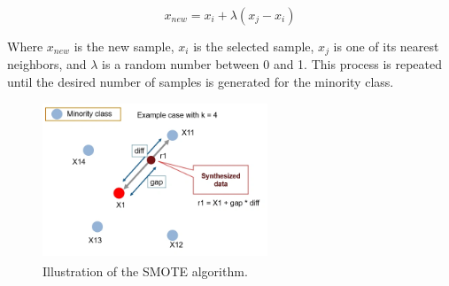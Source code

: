 \begin{equation}
	x_{new} = x_{i} + \lambda (x_{j} - x_{i})
\end{equation}

Where $x_{new}$ is the new sample, $x_{i}$ is the selected sample, $x_{j}$ is one of its nearest neighbors, and $\lambda$ is a random number
between 0 and 1. This process is repeated until the desired number of samples is generated for the minority class.

\begin{figure}[htbp!]
	\centering
	\includegraphics[width=0.6\textwidth]{../imgs/smote.png}
	\caption{Illustration of the SMOTE algorithm.\textsuperscript{\cite{analyticsvidhya-2020}}}
	\label{fig:smote}
\end{figure}